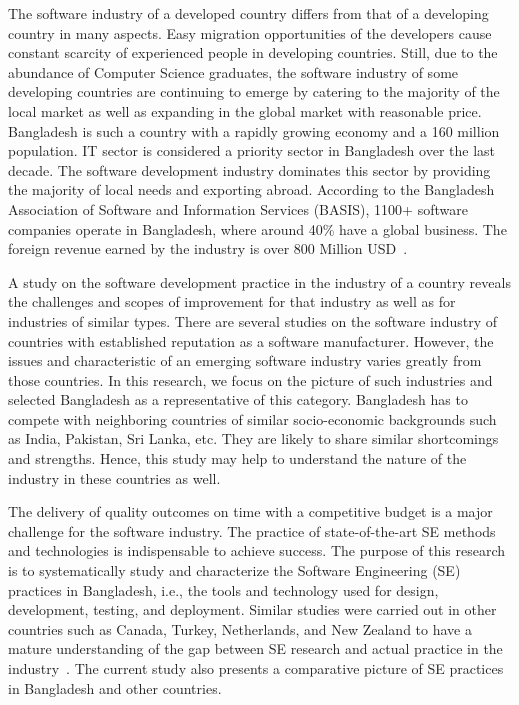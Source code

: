 The software industry of a developed country differs from that of a developing
country in many aspects. Easy migration opportunities of the developers cause
constant scarcity of experienced people in developing countries. Still, due to
the abundance of Computer Science graduates, the software industry of some
developing countries are continuing to emerge by catering to the majority of the
local market as well as expanding in the global market with reasonable price.
Bangladesh is such a country with a rapidly growing economy and a 160 million
population. IT sector is considered a priority sector in Bangladesh over the
last decade. The software development industry dominates this sector by
providing the majority of local needs and exporting abroad. According to the
Bangladesh Association of Software and Information Services (BASIS), 1100+
software companies operate in Bangladesh, where around 40\% have a global
business. The foreign revenue earned by the industry is over 800 Million
USD~\cite{BASIS2018}.

A study on the software development practice in the industry of a country
reveals the challenges and scopes of improvement for that industry as well as
for industries of similar types. There are several studies on the software
industry of countries with established reputation as a software manufacturer.
However, the issues and characteristic of an emerging software industry varies
greatly from those countries. In this research, we focus on the picture of such
industries and selected Bangladesh as a representative of this category.
Bangladesh has to compete with neighboring countries of similar socio-economic
backgrounds such as India, Pakistan, Sri Lanka, etc. They are likely to share
similar shortcomings and strengths. Hence, this study may help to understand the
nature of the industry in these countries as well.


 The delivery of quality outcomes on time with a competitive budget is a major
 challenge for the software industry. The practice of state-of-the-art SE
 methods and technologies is indispensable to achieve success. The purpose of
 this research is to systematically study and characterize the Software
 Engineering (SE) practices in Bangladesh, i.e., the tools and technology used
 for design, development, testing, and deployment. Similar studies were carried
 out in other countries such as Canada, Turkey, Netherlands, and New Zealand to
 have a mature understanding of the gap between SE research and actual practice
 in the industry~\cite{Garousi2013, Garousi2015, Vonken2012, Wang2018}. The
 current study also presents a comparative picture of SE practices in Bangladesh
 and other countries.

